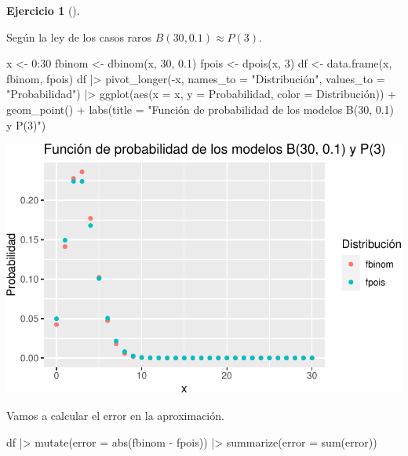 \documentclass[
  a4paper,
]{scrreport}
\newenvironment{Shaded}{\begin{snugshade}}{\end{snugshade}}
\newcommand{\AttributeTok}[1]{\textcolor[rgb]{0.40,0.45,0.13}{#1}}
\newcommand{\DecValTok}[1]{\textcolor[rgb]{0.68,0.00,0.00}{#1}}
\newcommand{\FloatTok}[1]{\textcolor[rgb]{0.68,0.00,0.00}{#1}}
\newcommand{\FunctionTok}[1]{\textcolor[rgb]{0.28,0.35,0.67}{#1}}
\newcommand{\NormalTok}[1]{\textcolor[rgb]{0.00,0.23,0.31}{#1}}
\newcommand{\OtherTok}[1]{\textcolor[rgb]{0.00,0.23,0.31}{#1}}
\newcommand{\SpecialCharTok}[1]{\textcolor[rgb]{0.37,0.37,0.37}{#1}}
\newcommand{\StringTok}[1]{\textcolor[rgb]{0.13,0.47,0.30}{#1}}
\theoremstyle{definition}
\newtheorem{exercise}{Ejercicio}[chapter]
\theoremstyle{remark}
\begin{document}
\begin{exercise}[]
\begin{enumerate}
\begin{tcolorbox}
  Según la ley de los casos raros \(B(30, 0.1) \approx P(3)\).

\begin{Shaded}
\begin{Highlighting}[]
\NormalTok{x }\OtherTok{\textless{}{-}} \DecValTok{0}\SpecialCharTok{:}\DecValTok{30}
\NormalTok{fbinom }\OtherTok{\textless{}{-}} \FunctionTok{dbinom}\NormalTok{(x, }\DecValTok{30}\NormalTok{, }\FloatTok{0.1}\NormalTok{)}
\NormalTok{fpois }\OtherTok{\textless{}{-}} \FunctionTok{dpois}\NormalTok{(x, }\DecValTok{3}\NormalTok{)}
\NormalTok{df }\OtherTok{\textless{}{-}} \FunctionTok{data.frame}\NormalTok{(x, fbinom, fpois)}
\NormalTok{df  }\SpecialCharTok{|\textgreater{}} 
    \FunctionTok{pivot\_longer}\NormalTok{(}\SpecialCharTok{{-}}\NormalTok{x, }\AttributeTok{names\_to =} \StringTok{"Distribución"}\NormalTok{, }\AttributeTok{values\_to =} \StringTok{"Probabilidad"}\NormalTok{)  }\SpecialCharTok{|\textgreater{}} 
    \FunctionTok{ggplot}\NormalTok{(}\FunctionTok{aes}\NormalTok{(}\AttributeTok{x =}\NormalTok{ x, }\AttributeTok{y =}\NormalTok{ Probabilidad, }\AttributeTok{color =}\NormalTok{ Distribución)) }\SpecialCharTok{+} 
    \FunctionTok{geom\_point}\NormalTok{() }\SpecialCharTok{+}
    \FunctionTok{labs}\NormalTok{(}\AttributeTok{title =} \StringTok{"Función de probabilidad de los modelos B(30, 0.1) y P(3)"}\NormalTok{)}
\end{Highlighting}
\end{Shaded}

  \includegraphics{06-distribuciones-probabilidad_files/figure-pdf/unnamed-chunk-16-1.pdf}

  Vamos a calcular el error en la aproximación.

\begin{Shaded}
\begin{Highlighting}[]
\NormalTok{df  }\SpecialCharTok{|\textgreater{}} 
    \FunctionTok{mutate}\NormalTok{(}\AttributeTok{error =} \FunctionTok{abs}\NormalTok{(fbinom }\SpecialCharTok{{-}}\NormalTok{ fpois))  }\SpecialCharTok{|\textgreater{}} 
    \FunctionTok{summarize}\NormalTok{(}\AttributeTok{error =} \FunctionTok{sum}\NormalTok{(error))}
\end{Highlighting}
\end{Shaded}


\end{tcolorbox}
\end{enumerate}
\end{exercise}
\end{document}
